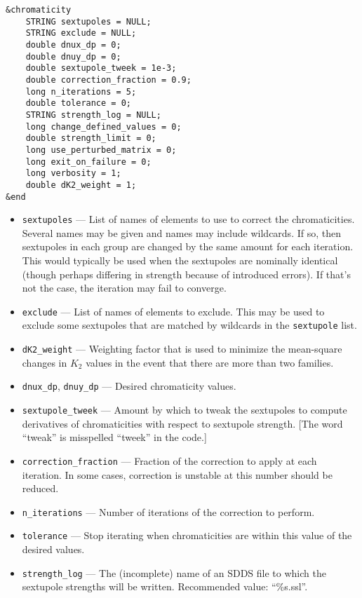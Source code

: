 \documentclass[11pt]{article}
\begin{document}
\begin{verbatim}
&chromaticity
    STRING sextupoles = NULL;
    STRING exclude = NULL;
    double dnux_dp = 0;
    double dnuy_dp = 0;
    double sextupole_tweek = 1e-3;
    double correction_fraction = 0.9;
    long n_iterations = 5;
    double tolerance = 0;
    STRING strength_log = NULL;
    long change_defined_values = 0;
    double strength_limit = 0;
    long use_perturbed_matrix = 0;    
    long exit_on_failure = 0;
    long verbosity = 1;
    double dK2_weight = 1;
&end
\end{verbatim}

\begin{itemize}
\item \verb|sextupoles| --- List of names of elements to use to correct the chromaticities.  Several names may be given and names may include
  wildcards. If so, then sextupoles in each group are changed by the same amount for each iteration.
  This would typically be used when the sextupoles are nominally identical (though perhaps differing in strength because of
  introduced errors). If that's not the case, the iteration may fail to converge.
\item \verb|exclude| --- List of names of elements to exclude. This may be used to exclude some sextupoles that are matched by wildcards in
  the \verb|sextupole| list.
\item \verb|dK2_weight| --- Weighting factor that is used to minimize the mean-square changes in $K_2$ values in the
  event that there are more than two families.
\item \verb|dnux_dp|, \verb|dnuy_dp| --- Desired chromaticity values.
\item \verb|sextupole_tweek| --- Amount by which to tweak the sextupoles to compute derivatives of
chromaticities with respect to sextupole strength.  [The word ``tweak'' is misspelled ``tweek'' in the code.]
\item \verb|correction_fraction| --- Fraction of the correction to apply at each iteration.  In some
cases, correction is unstable at this number should be reduced.
\item \verb|n_iterations| --- Number of iterations of the correction to perform.
\item \verb|tolerance| --- Stop iterating when chromaticities are within this value of the
desired values.
\item \verb|strength_log| --- The (incomplete) name of an SDDS file to which the sextupole strengths will
be written.  Recommended value: ``\%s.ssl''.

\end{itemize}
\end{document}
